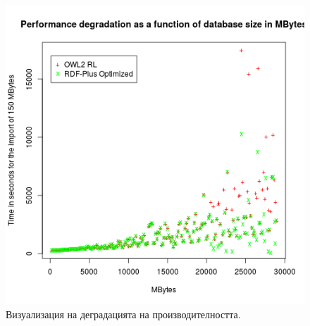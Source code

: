 \begin{figure}
\centering
\includegraphics[width=\textwidth]{Figures/performance-degradation-both}
\decoRule
\caption[Performance degradation]{Визуализация на деградацията на производителността.}
\label{fig:performance-degradation}
\end{figure}

